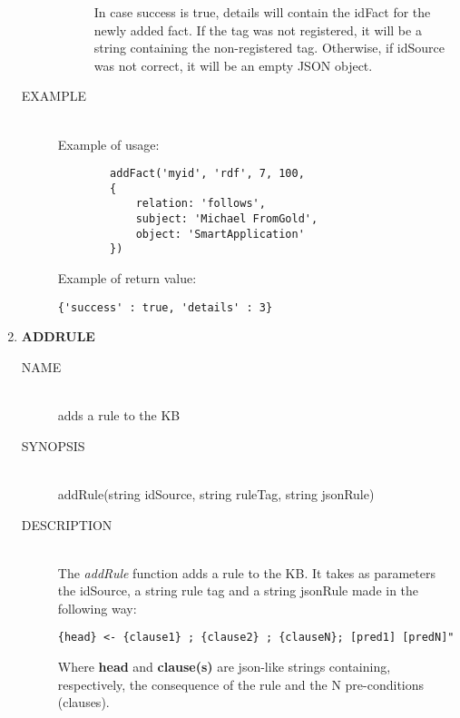 \documentclass{article}
\begin{document}
\begin{enumerate}
\begin{description}
\begin{description}
			In case success is true, details will contain the idFact for the newly added fact. 
			If the tag was not registered, it will be a string containing the non-registered tag. Otherwise, if idSource was not correct, it will be an empty JSON object. 
		\end{description}
        \item[EXAMPLE] \hfill \\
    	Example of usage:
    	\begin{lstlisting}
        addFact('myid', 'rdf', 7, 100, 
        {
            relation: 'follows', 
            subject: 'Michael FromGold', 
            object: 'SmartApplication'
        })
    	\end{lstlisting}
    	Example of return value:
        \begin{lstlisting}
{'success' : true, 'details' : 3}
        \end{lstlisting}
        \end{description}
    \item \textbf{ADDRULE}
        \begin{description}
        \item[NAME] \hfill \\
        adds a rule to the KB
    	\item[SYNOPSIS] \hfill \\
    	addRule(string idSource, string ruleTag, string jsonRule)
    	\item[DESCRIPTION] \hfill \\
    	The \textit{addRule} function adds a rule to the KB. It takes as parameters the idSource, a string rule tag and a string jsonRule made in the following way: \\
    	\begin{lstlisting}
{head} <- {clause1} ; {clause2} ; {clauseN}; [pred1] [predN]"
    	\end{lstlisting}
    	Where \textbf{head} and \textbf{clause(s)} are json-like strings containing, respectively, the consequence of the rule and the N pre-conditions (clauses).
    	

\end{description}
\end{enumerate}
\end{document}
